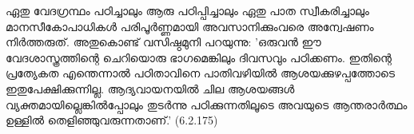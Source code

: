 ഏതു വേദഗ്രന്ഥം പഠിച്ചാലും ആരു പഠിപ്പിച്ചാലും ഏതു പാത സ്വീകരിച്ചാലും മാനസീകോപാധികള്‍ പരിപൂര്‍ണ്ണമായി അവസാനിക്കുംവരെ  അന്വേഷണം   നിര്‍ത്തരുത്. അതുകൊണ്ട്‌ വസിഷ്ഠമുനി  പറയുന്നു: 'ഒരുവന്‍ ഈ വേദശാസ്ത്രത്തിന്റെ ചെറിയൊരു ഭാഗമെങ്കിലും ദിവസവും പഠിക്കണം. ഇതിന്റെ പ്രത്യേകത എന്തെന്നാല്‍ പഠിതാവിനെ പാതിവഴിയില്‍ ആശയക്കുഴപ്പത്തോടെ ഇതുപേക്ഷിക്കുന്നില്ല. ആദ്യവായനയില്‍ ചില ആശയങ്ങള്‍ വ്യക്തമായില്ലെങ്കില്‍പ്പോലും തുടര്‍ന്നു പഠിക്കുന്നതിലൂടെ അവയുടെ ആന്തരാര്‍ത്ഥം ഉള്ളില്‍ തെളിഞ്ഞുവരുന്നതാണ്‌.' (6.2.175)
